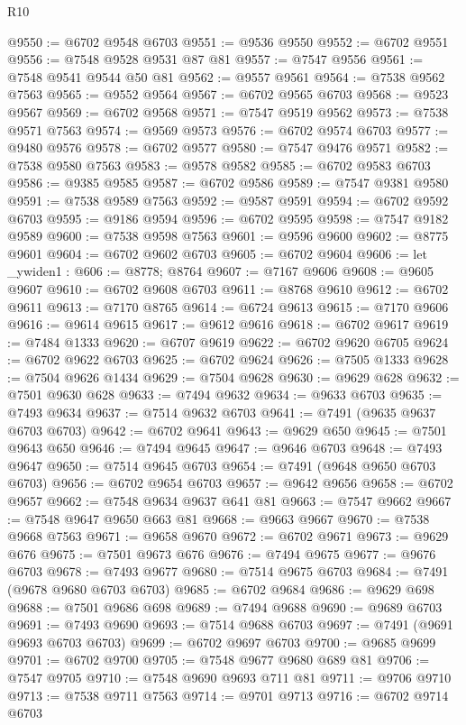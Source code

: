 \begin{lexlean}{R10}
\begin{coremodule}
{{{{{{{{{{{{{{{{{{{{{{{{{{{{{{{{{{{{{{{{{{{{{{{{{{{{{{{{{{{{{{{{{{{{{{{{{{{{{{{{{{{{@9550 := @6702 @9548 @6703
@9551 := @9536 @9550
@9552 := @6702 @9551
@9556 := @7548 @9528 @9531 @87 @81
@9557 := @7547 @9556
@9561 := @7548 @9541 @9544 @50 @81
@9562 := @9557 @9561
@9564 := @7538 @9562 @7563
@9565 := @9552 @9564
@9567 := @6702 @9565 @6703
@9568 := @9523 @9567
@9569 := @6702 @9568
@9571 := @7547 @9519 @9562
@9573 := @7538 @9571 @7563
@9574 := @9569 @9573
@9576 := @6702 @9574 @6703
@9577 := @9480 @9576
@9578 := @6702 @9577
@9580 := @7547 @9476 @9571
@9582 := @7538 @9580 @7563
@9583 := @9578 @9582
@9585 := @6702 @9583 @6703
@9586 := @9385 @9585
@9587 := @6702 @9586
@9589 := @7547 @9381 @9580
@9591 := @7538 @9589 @7563
@9592 := @9587 @9591
@9594 := @6702 @9592 @6703
@9595 := @9186 @9594
@9596 := @6702 @9595
@9598 := @7547 @9182 @9589
@9600 := @7538 @9598 @7563
@9601 := @9596 @9600
@9602 := @8775 @9601
@9604 := @6702 @9602 @6703
@9605 := @6702 @9604
@9606 := let _ywiden1 : @606 := @8778; @8764
@9607 := @7167 @9606
@9608 := @9605 @9607
@9610 := @6702 @9608 @6703
@9611 := @8768 @9610
@9612 := @6702 @9611
@9613 := @7170 @8765
@9614 := @6724 @9613
@9615 := @7170 @9606
@9616 := @9614 @9615
@9617 := @9612 @9616
@9618 := @6702 @9617
@9619 := @7484 @1333
@9620 := @6707 @9619
@9622 := @6702 @9620 @6705
@9624 := @6702 @9622 @6703
@9625 := @6702 @9624
@9626 := @7505 @1333
@9628 := @7504 @9626 @1434
@9629 := @7504 @9628
@9630 := @9629 @628
@9632 := @7501 @9630 @628
@9633 := @7494 @9632
@9634 := @9633 @6703
@9635 := @7493 @9634
@9637 := @7514 @9632 @6703
@9641 := @7491 (@9635 @9637 @6703 @6703)
@9642 := @6702 @9641
@9643 := @9629 @650
@9645 := @7501 @9643 @650
@9646 := @7494 @9645
@9647 := @9646 @6703
@9648 := @7493 @9647
@9650 := @7514 @9645 @6703
@9654 := @7491 (@9648 @9650 @6703 @6703)
@9656 := @6702 @9654 @6703
@9657 := @9642 @9656
@9658 := @6702 @9657
@9662 := @7548 @9634 @9637 @641 @81
@9663 := @7547 @9662
@9667 := @7548 @9647 @9650 @663 @81
@9668 := @9663 @9667
@9670 := @7538 @9668 @7563
@9671 := @9658 @9670
@9672 := @6702 @9671
@9673 := @9629 @676
@9675 := @7501 @9673 @676
@9676 := @7494 @9675
@9677 := @9676 @6703
@9678 := @7493 @9677
@9680 := @7514 @9675 @6703
@9684 := @7491 (@9678 @9680 @6703 @6703)
@9685 := @6702 @9684
@9686 := @9629 @698
@9688 := @7501 @9686 @698
@9689 := @7494 @9688
@9690 := @9689 @6703
@9691 := @7493 @9690
@9693 := @7514 @9688 @6703
@9697 := @7491 (@9691 @9693 @6703 @6703)
@9699 := @6702 @9697 @6703
@9700 := @9685 @9699
@9701 := @6702 @9700
@9705 := @7548 @9677 @9680 @689 @81
@9706 := @7547 @9705
@9710 := @7548 @9690 @9693 @711 @81
@9711 := @9706 @9710
@9713 := @7538 @9711 @7563
@9714 := @9701 @9713
@9716 := @6702 @9714 @6703
}}}}}}}}}}}}}}}}}}}}}}}}}}}}}}}}}}}}}}}}}}}}}}}}}}}}}}}}}}}}}}}}}}}}}}}}}}}}}}}}}}}}
\end{coremodule}
\end{lexlean}
